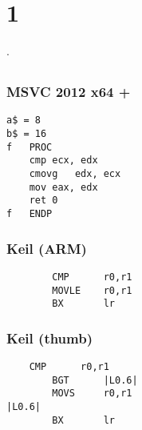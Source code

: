 ﻿\section{ 1}

.

\subsection{}

\subsubsection{MSVC 2012 x64 + }

\begin{lstlisting}
a$ = 8
b$ = 16
f	PROC
	cmp	ecx, edx
	cmovg	edx, ecx
	mov	eax, edx
	ret	0
f	ENDP
\end{lstlisting}

\subsubsection{Keil (ARM)}

\begin{lstlisting}
        CMP      r0,r1
        MOVLE    r0,r1
        BX       lr
\end{lstlisting}

\subsubsection{Keil (thumb)}
        
\begin{lstlisting}
	CMP      r0,r1
        BGT      |L0.6|
        MOVS     r0,r1
|L0.6|
        BX       lr
\end{lstlisting}

